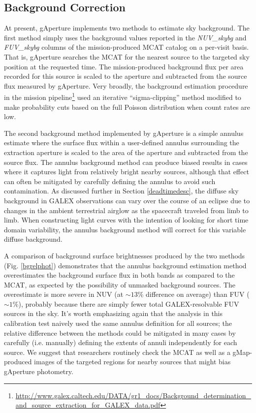 \documentclass[preprint]{aastex}
\begin{document}
\subsection{Background Correction}
\label{bgcorr}
At present, gAperture implements two methods to estimate sky background. The first method simply uses the background values reported in the \emph{NUV\_skybg} and \emph{FUV\_skybg} columns of the mission-produced MCAT catalog on a per-visit basis. That is, gAperture searches the MCAT for the nearest source to the targeted sky position at the requested time. The mission-produced background flux per area recorded for this source is scaled to the aperture and subtracted from the source flux measured by gAperture. Very broadly, the background estimation procedure in the mission pipeline\footnote{\url{http://www.galex.caltech.edu/DATA/gr1_docs/Background_determination_and_source_extraction_for_GALEX_data.pdf}} used an iterative ``sigma-clipping'' method modified to make probability cuts based on the full Poisson distribution when count rates are low.

The second background method implemented by gAperture is a simple annulus estimate where the surface flux within a user-defined annulus surrounding the extraction aperture is scaled to the area of the aperture and subtracted from the source flux. The annulus background method can produce biased results in cases where it captures light from relatively bright nearby sources, although that effect can often be mitigated by carefully defining the annulus to avoid such contamination. As discussed further in Section \ref{deadtimedesc}, the diffuse sky background in GALEX observations can vary over the course of an eclipse due to changes in the ambient terrestrial airglow as the spacecraft traveled from limb to limb. When constructing light curves with the intention of looking for short time domain variability, the annulus background method will correct for this variable diffuse background.

A comparison of background surface brightnesses produced by the two methods (Fig. \ref{bgrelphot}) demonstrates that the annulus background estimation method overestimates the background surface flux in both bands as compared to the MCAT, as expected by the possibility of unmasked background sources. The overestimate is more severe in NUV (at $\sim 13\%$ difference on average) than FUV ($\sim 1\%$), probably because there are simply fewer total GALEX-resolvable FUV sources in the sky. It's worth emphasizing again that the analysis in this calibration test naively used the same annulus definition for all sources; the relative difference between the methods could be mitigated in many cases by carefully (i.e. manually) defining the extents of annuli independently for each source. We suggest that researchers routinely check the MCAT as well as a gMap-produced images of the targeted regions for nearby sources that might bias gAperture photometry.
\end{document}
